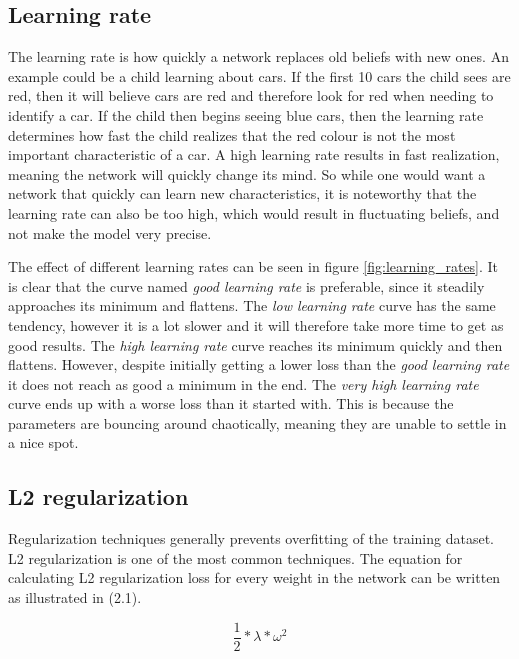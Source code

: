 \subsection{Learning rate}
The learning rate is how quickly a network replaces old beliefs with new ones. An example could be a child learning about cars. If the first 10 cars the child sees are red, then it will believe cars are red and therefore look for red when needing to identify a car. If the child then begins seeing blue cars, then the learning rate determines how fast the child realizes that the red colour is not the most important characteristic of a car. A high learning rate results in fast realization, meaning the network will quickly change its mind. So while one would want a network that quickly can learn new characteristics, it is noteworthy that the learning rate can also be too high, which would result in fluctuating beliefs, and not make the model very precise. 


The effect of different learning rates can be seen in figure \ref{fig:learning_rates}. It is clear that the curve named \emph{good learning rate} is preferable, since it steadily approaches its minimum and flattens. The \emph{low learning rate} curve has the same tendency, however it is a lot slower and it will therefore take more time to get as good results. The \emph{high learning rate} curve reaches its minimum quickly and then flattens. However, despite initially getting a lower loss than the \emph{good learning rate} it does not reach as good a minimum in the end. The \emph{very high learning rate} curve ends up with a worse loss than it started with. This is because the parameters are bouncing around chaotically, meaning they are unable to settle in a nice spot. 

\subsection{L2 regularization}
Regularization techniques generally prevents overfitting of the training dataset. L2 regularization is one of the most common techniques. The equation for calculating L2 regularization loss for every weight in the network can be written as illustrated in (2.1). 

\begin{equation}
\dfrac{1}{2} * \lambda * \omega^2
\end{equation}

